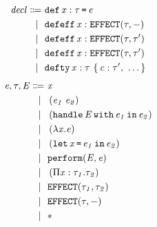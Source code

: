 \begin{multicols}{2}
	\begin{align*}
		\DefineTerm{decl}{\StahlDef{x}{\StahlName{\tau}}{\StahlName{e}}}
		\Case{\StahlDefEffNoReturn{x}{\StahlName{\tau}}}
		\Case{\StahlDefEff{x}{\StahlName{\tau}}{\StahlName{\tau'}}}
		\Case{\StahlDefEff{x}{\StahlName{\tau}}{\StahlName{\tau'}}}
		\Case{\StahlDefTy{x}{\StahlName{\tau}}{\StahlCtor{c}{\tau'},\ \ldots}}
	\end{align*}\break
	\begin{align*}
		\mathit{e, \tau, E}\Coloneqq&\ \mathit{x}\\
		\lvert\ &\ \left(\mathit{e_1}\;\mathit{e_2}\right)\\
		\lvert\ &\ \left(\texttt{handle}\,\mathit{E}\,\texttt{with}\,\mathit{e_1}\,\texttt{in}\,\mathit{e_2}\right)\\
		\lvert\ &\ \left(\lambda\mathit{x}.\mathit{e}\right)\\
		\lvert\ &\ \left(\texttt{let}\,\mathit{x}\,\texttt{=}\,\mathit{e_1}\,\texttt{in}\,\mathit{e_2}\right)\\
		\lvert\ &\ \texttt{perform}(\mathit{E}, \mathit{e})\\
		\lvert\ &\ \left(\Pi\mathit{x}:\mathit{\tau_1}.\mathit{\tau_2}\right)\\
		\lvert\ &\ \mathtt{EFFECT}(\mathit{\tau_1}, \mathit{\tau_2})\\
		\lvert\ &\ \mathtt{EFFECT}(\mathit{\tau}, -)\\
		\lvert\ &\ \mathtt{*}\\
	\end{align*}
\end{multicols}
